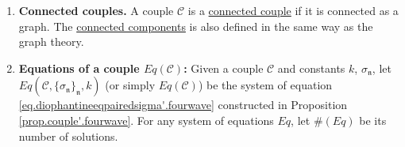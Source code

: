 \begin{defn}\label{def.morecouple.fourwave}
\begin{enumerate}
 \item \textbf{Connected couples.} A couple $\mathcal{C}$ is a \underline{connected couple} if it is connected as a graph. The \underline{connected components} is also defined in the same way as the graph theory. 
 \item \textbf{Equations of a couple $Eq(\mathcal{C})$:} Given a couple $\mathcal{C}$ and constants $k$, $\sigma_{\mathfrak{n}}$, let $Eq(\mathcal{C},\{\sigma_{\mathfrak{n}}\}_{\mathfrak{n}}, k)$ (or simply $Eq(\mathcal{C})$) be the system of equation \eqref{eq.diophantineeqpairedsigma'.fourwave} constructed in Proposition \ref{prop.couple'.fourwave}. For any system of equations $Eq$, let $\#(Eq)$ be its number of solutions.
\end{enumerate}
\end{defn}


